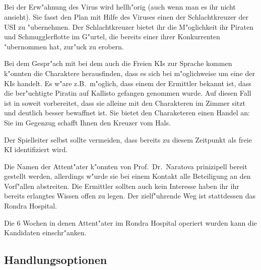 \subsection{\xl{}}
Bei der Erw"ahnung des Virus wird \xl{} hellh"orig (auch wenn man es ihr nicht ansieht). Sie fasst den Plan mit Hilfe des Viruses einen der Schlachtkreuzer der USI zu "ubernehmen. Der Schlachtkreuzer bietet ihr die M"oglichkeit ihr Piraten und Schmugglerflotte im G"urtel, die bereits einer ihrer Konkurrenten "ubernommen hat, zur"uck zu erobern.

Bei dem Gespr"ach mit \ml{} bei dem auch die Freien KIs zur Sprache kommen k"onnten die Charaktere herausfinden, dass es sich bei \xl{} m"oglichweise um eine der KIs handelt. Es w"are z.B.~m"oglich, dass einem der Ermittler bekannt ist, dass die ber"uchtigte Piratin auf Kallisto gefangen genommen wurde. Auf diesen Fall ist \xl{} in soweit vorbereitet, dass sie alleine mit den Charakteren im Zimmer sitzt und deutlich besser bewaffnet ist. Sie bietet den Charaketeren einen Handel an: Sie im Gegenzug schafft Ihnen den Kreuzer vom Hals.

\begin{remarks}
	Der Spielleiter selbst sollte vermeiden, dass \xl{} bereits zu diesem Zeitpunkt als freie KI identifiziert wird.

	Die Namen der Attent"ater k"onnten von Prof.~Dr.~Naratova prinizipell bereit gestellt werden, allerdings w"urde sie bei einem Kontakt alle Beteiligung an den Vorf"allen abstreiten. Die Ermittler sollten auch kein Interesse haben ihr ihr bereits erlangtes Wissen offen zu legen. Der zielf"uhrende Weg ist stattdessen das Rondra Hospital.

	Die 6 Wochen in denen Attent"ater im Rondra Hospital operiert wurden kann die Kandidaten einschr"anken.
\end{remarks}

\subsection{Handlungsoptionen}

